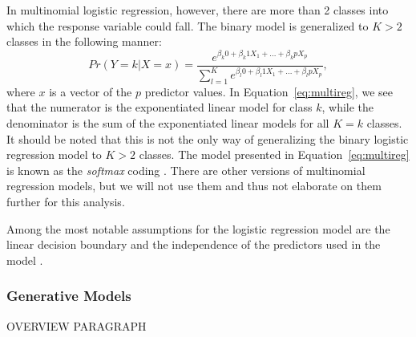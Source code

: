 \documentclass[12pt]{article}
\begin{document}
 In multinomial logistic regression, however, there are more than 2 classes 
 into which the response variable could fall.  The binary model is generalized 
 to $K > 2$ classes in the following manner:
 \begin{equation}
  \label{eq:multireg}
  Pr( Y = k | X = x ) = 
  \frac{e ^ {\beta_k0 + \beta_k1X_1 + ... + \beta_kpX_p}}
  { \sum_{l = 1} ^ {K}  e ^ {\beta_l0 + \beta_l1X_1 + ... + \beta_lpX_p}},
\end{equation}
where $x$ is a vector of the $p$ predictor values.  In 
Equation~\eqref{eq:multireg}, we see that the numerator is the exponentiated 
linear model for class $k$, while the denominator is the sum of the 
exponentiated linear models for all $K = k$ classes.  It should be noted 
that this is not the only way of generalizing the binary logistic regression 
model to $K >2$ classes.  The model presented in Equation~\eqref{eq:multireg} 
is known as the \textit{softmax} coding \citep{james2021introduction}.  
There are other versions of multinomial regression models, but we will not 
use them and thus not elaborate on them further for this analysis.  

Among the most notable assumptions for the logistic regression model are 
the linear decision boundary and the independence of the predictors used 
in the model \citep{khan2023comparison}.

\subsubsection{Generative Models}
\label{sec:gm}

OVERVIEW PARAGRAPH
\end{document}
